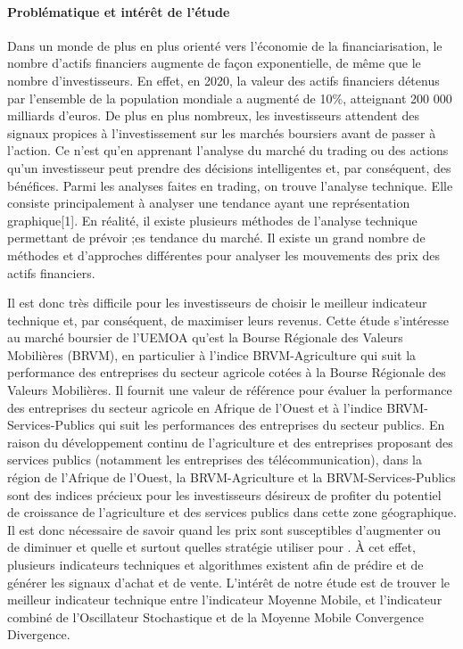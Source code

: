 \paragraph{Problématique et intérêt de
l'étude}\label{probluxe9matique-et-intuxe9ruxeat-de-luxe9tude}

Dans un monde de plus en plus orienté vers l'économie de la
financiarisation, le nombre d'actifs financiers augmente de façon
exponentielle, de même que le nombre d'investisseurs. En effet, en 2020,
la valeur des actifs financiers détenus par l'ensemble de la population
mondiale a augmenté de 10\%, atteignant 200 000 milliards d'euros. De
plus en plus nombreux, les investisseurs attendent des signaux propices
à l'investissement sur les marchés boursiers avant de passer à l'action.
Ce n'est qu'en apprenant l'analyse du marché du trading ou des actions
qu'un investisseur peut prendre des décisions intelligentes et, par
conséquent, des bénéfices. Parmi les analyses faites en trading, on
trouve l'analyse technique. Elle consiste principalement à analyser une
tendance ayant une représentation graphique{[}1{]}. En réalité, il
existe plusieurs méthodes de l'analyse technique permettant de prévoir
;es tendance du marché. Il existe un grand nombre de méthodes et
d'approches différentes pour analyser les mouvements des prix des actifs
financiers.

Il est donc très difficile pour les investisseurs de choisir le meilleur
indicateur technique et, par conséquent, de maximiser leurs revenus.
Cette étude s'intéresse au marché boursier de l'UEMOA qu'est la Bourse
Régionale des Valeurs Mobilières (BRVM), en particulier à l'indice
BRVM-Agriculture qui suit la performance des entreprises du secteur
agricole cotées à la Bourse Régionale des Valeurs Mobilières. Il fournit
une valeur de référence pour évaluer la performance des entreprises du
secteur agricole en Afrique de l'Ouest et à l'indice
BRVM-Services-Publics qui suit les performances des entreprises du
secteur publics. En raison du développement continu de l'agriculture et
des entreprises proposant des services publics (notamment les
entreprises des télécommunication), dans la région de l'Afrique de
l'Ouest, la BRVM-Agriculture et la BRVM-Services-Publics sont des
indices précieux pour les investisseurs désireux de profiter du
potentiel de croissance de l'agriculture et des services publics dans
cette zone géographique. Il est donc nécessaire de savoir quand les prix
sont susceptibles d'augmenter ou de diminuer et quelle et surtout
quelles stratégie utiliser pour . À cet effet, plusieurs indicateurs
techniques et algorithmes existent afin de prédire et de générer les
signaux d'achat et de vente. L'intérêt de notre étude est de trouver le
meilleur indicateur technique entre l'indicateur Moyenne Mobile, et
l'indicateur combiné de l'Oscillateur Stochastique et de la Moyenne
Mobile Convergence Divergence.

